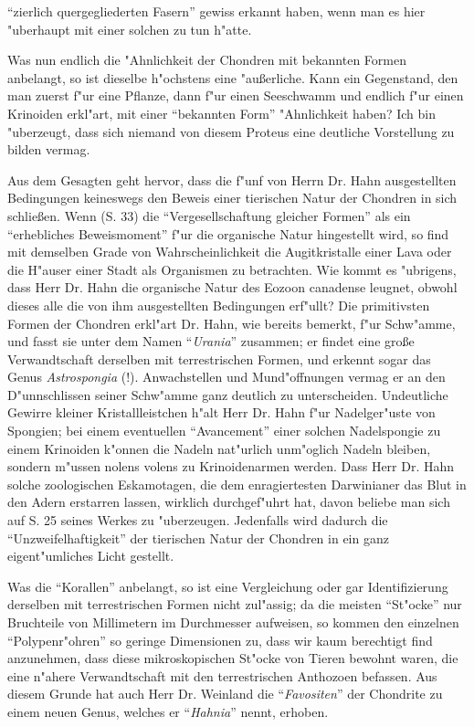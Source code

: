 \documentclass[a4paper, 12pt, oneside]{article}
\begin{document}
"`zierlich quergegliederten Fasern"' gewiss erkannt haben, wenn man es hier "uberhaupt mit einer solchen zu tun h"atte.

Was nun endlich die "Ahnlichkeit der Chondren mit bekannten Formen anbelangt, so ist dieselbe h"ochstens eine "außerliche. Kann ein Gegenstand, den man zuerst f"ur eine Pflanze, dann f"ur einen Seeschwamm und endlich f"ur einen Krinoiden erkl"art, mit einer "`bekannten Form"' "Ahnlichkeit haben? Ich bin "uberzeugt, dass sich niemand von diesem Proteus eine deutliche Vorstellung zu bilden vermag.

Aus dem Gesagten geht hervor, dass die f"unf von Herrn Dr. Hahn ausgestellten Bedingungen keineswegs den Beweis einer tierischen Natur der Chondren in sich schließen. Wenn (S. 33) die "`Vergesellschaftung gleicher Formen"' als ein "`erhebliches Beweismoment"' f"ur die organische Natur hingestellt wird, so find mit demselben Grade von Wahrscheinlichkeit die Augitkristalle einer Lava oder die H"auser einer Stadt als Organismen zu betrachten. Wie kommt es "ubrigens, dass Herr Dr. Hahn die organische Natur des Eozoon canadense leugnet, obwohl dieses alle die von ihm ausgestellten Bedingungen erf"ullt? Die primitivsten Formen der Chondren erkl"art Dr. Hahn, wie bereits bemerkt, f"ur Schw"amme, und fasst sie unter dem Namen "`\emph{Urania}"' zusammen; er findet eine große Verwandtschaft derselben mit terrestrischen Formen, und erkennt sogar das Genus \emph{Astrospongia} (!). Anwachstellen und Mund"offnungen vermag er an den D"unnschlissen seiner Schw"amme ganz deutlich zu unterscheiden. Undeutliche Gewirre kleiner Kristallleistchen h"alt Herr Dr. Hahn f"ur Nadelger"uste von Spongien; bei einem eventuellen "`Avancement"' einer solchen Nadelspongie zu einem Krinoiden k"onnen die Nadeln nat"urlich unm"oglich Nadeln bleiben, sondern m"ussen nolens volens zu Krinoidenarmen werden. Dass Herr Dr. Hahn solche zoologischen Eskamotagen, die dem enragiertesten Darwinianer das Blut in den Adern erstarren lassen, wirklich durchgef"uhrt hat, davon beliebe man sich auf S. 25 seines Werkes zu "uberzeugen. Jedenfalls wird dadurch die "`Unzweifelhaftigkeit"' der tierischen Natur der Chondren in ein ganz eigent"umliches Licht gestellt.

Was die "`Korallen"' anbelangt, so ist eine Vergleichung oder gar Identifizierung derselben mit terrestrischen Formen nicht zul"assig; da die meisten "`St"ocke"' nur Bruchteile von Millimetern im Durchmesser aufweisen, so kommen den einzelnen "`Polypenr"ohren"' so geringe Dimensionen zu, dass wir kaum berechtigt find anzunehmen, dass diese mikroskopischen St"ocke von Tieren bewohnt waren, die eine n"ahere Verwandtschaft mit den terrestrischen Anthozoen befassen. Aus diesem Grunde hat auch Herr Dr. Weinland die "`\emph{Favositen}"' der Chondrite zu einem neuen Genus, welches er "`\emph{Hahnia}"' nennt, erhoben.
\end{document}
